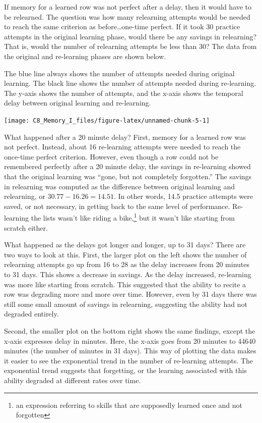 \documentclass[
  oneside,
  12pt]{crumpbook}
\begin{document}
If memory for a learned row was not perfect after a delay, then it would have to be relearned. The question was how many relearning attempts would be needed to reach the same criterion as before\ldots one-time perfect. If it took 30 practice attempts in the original learning phase, would there be any savings in relearning? That is, would the number of relearning attempts be less than 30? The data from the original and re-learning phases are shown below.

The blue line always shows the number of attempts needed during original learning. The black line shows the number of attempts needed during re-learning. The y-axis shows the number of attempts, and the x-axis shows the temporal delay between original learning and re-learning.

\texttt{[image: C8\_Memory\_I\_files/figure-latex/unnamed-chunk-5-1]}

What happened after a 20 minute delay? First, memory for a learned row was not perfect. Instead, about 16 re-learning attempts were needed to reach the once-time perfect criterion. However, even though a row could not be remembered perfectly after a 20 minute delay, the savings in re-learning showed that the original learning was ``gone, but not completely forgotten.'' The savings in relearning was computed as the difference between original learning and relearning, or
\(30.77-16.26 = 14.51\). In other words, 14.5 practice attempts were saved, or not necessary, in getting back to the same level of performance. Re-learning the lists wasn't like riding a bike,\footnote{an expression referring to skills that are supposedly learned once and not forgotten} but it wasn't like starting from scratch either.

What happened as the delays got longer and longer, up to 31 days? There are two ways to look at this. First, the larger plot on the left shows the number of relearning attempts go up from 16 to 28 as the delay increases from 20 minutes to 31 days. This shows a decrease in savings. As the delay increased, re-learning was more like starting from scratch. This suggested that the ability to recite a row was degrading more and more over time. However, even by 31 days there was still some small amount of savings in relearning, suggesting the ability had not degraded entirely.

Second, the smaller plot on the bottom right shows the same findings, except the x-axis expresses delay in minutes. Here, the x-axis goes from 20 minutes to 44640 minutes (the number of minutes in 31 days). This way of plotting the data makes it easier to see the exponential trend in the number of re-learning attempts. The exponential trend suggests that forgetting, or the learning associated with this ability degraded at different rates over time.
\end{document}
